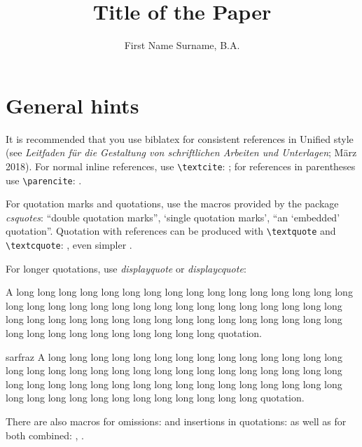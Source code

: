 \documentclass[naustrian,english]{univie-ling-paper}
\author{First Name Surname, B.A.}
\title{Title of the Paper}
\begin{document}
\maketitle

\makedeclaration

\tableofcontents

\section{General hints}\label{sec:hints}

It is recommended that you use \textsf{biblatex} for consistent references in Unified style
(see \foreignlanguage{naustrian}{\emph{Leitfaden für die Gestaltung von schriftlichen Arbeiten und Unterlagen}; März 2018}).
For normal inline references, use \verb|\textcite|: \textcite[22]{sarfraz}; for references in parentheses use \verb|\parencite|:
\parencite{sarfraz}.

For quotation marks and quotations, use the macros provided by the package \emph{csquotes}: \enquote{double quotation marks},
\enquote*{single quotation marks}, \enquote{an \enquote{embedded} quotation}. Quotation with references can be produced with
\verb|\textquote| and \verb|\textcquote|: , even simpler
.

For longer quotations, use \emph{displayquote} or \emph{displaycquote}:

\begin{displayquote}
	A long long long long long long long long long long long long long long long long long long
	long long long long long long long long long long long long long long long long long long long long
	long long long long long long long long long long long long long long long long long long long long
	quotation.
\end{displayquote}

\begin{displaycquote}[246]{sarfraz}
	A long long long long long long long long long long long long long long long long long long
	long long long long long long long long long long long long long long long long long long long long
	long long long long long long long long long long long long long long long long long long long long
	quotation.
\end{displaycquote}
%
There are also macros for omissions: \textelp{} and insertions in quotations:  as well as for both combined:
, .
\end{document}
